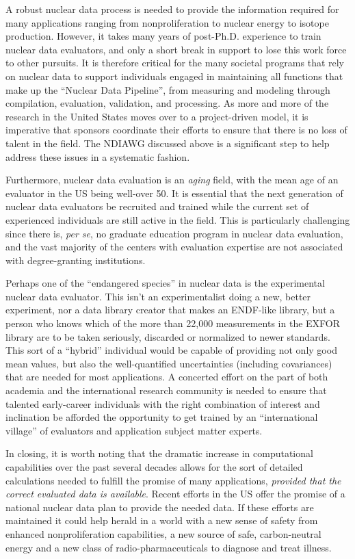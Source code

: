\documentclass[letterpaper]{ar-1col}
\begin{document}
A robust nuclear data process is needed to provide the information required for many applications ranging from nonproliferation to nuclear energy to isotope production.
 However, it takes many years of post-Ph.D. experience to train nuclear data evaluators, and only a short break in support to lose  this work force to other pursuits.
 It is therefore critical for the many societal programs that rely on nuclear data to support individuals engaged in maintaining all functions that make up the \enquote{Nuclear Data Pipeline}, from measuring and modeling through compilation, evaluation, validation, and processing.
 As more and more of the research in the United States moves over to a project-driven model, it is imperative that sponsors coordinate their efforts to ensure that there is no loss of talent in the field.
 The NDIAWG discussed above is a significant step to help address these issues in a systematic fashion.

Furthermore, nuclear data evaluation is an \emph{aging} field, with the mean age of an evaluator in the US being well-over 50.
 It is essential that the next generation of nuclear data evaluators be recruited and trained while the current set of experienced individuals are still active in the field.
 This is particularly challenging since there is, \emph{per se}, no graduate education program in nuclear data evaluation, and the vast majority of the centers with evaluation expertise are not associated with degree-granting institutions.
 

Perhaps one of the \enquote{endangered species} in nuclear data is the experimental nuclear data evaluator.
 This isn't an experimentalist doing a new, better experiment, nor a data library creator that makes an ENDF-like library, but a person who knows which of the more than 22,000 measurements in the EXFOR library are to be taken seriously, discarded or normalized to newer standards.
 This sort of a \enquote{hybrid} individual would be capable of providing not only good mean values, but also the well-quantified uncertainties (including covariances) that are needed for most applications.
 A concerted effort on the part of both academia and the international research community is needed to ensure that talented early-career individuals with the right combination of interest and inclination be afforded the opportunity to get trained by an \enquote{international village} of evaluators and application subject matter experts.
 

In closing, it is worth noting that the dramatic increase in computational capabilities over the past several decades allows for the sort of detailed calculations needed to fulfill the promise of many applications, \emph{provided that the correct evaluated data is available}.
  Recent efforts in the US offer the promise of a national nuclear data plan to provide the needed data.
 If these efforts are maintained it could help herald in a world with a new sense of safety from enhanced nonproliferation capabilities, a new source of safe, carbon-neutral energy and a new class of radio-pharmaceuticals to diagnose and treat illness.  
\end{document}
